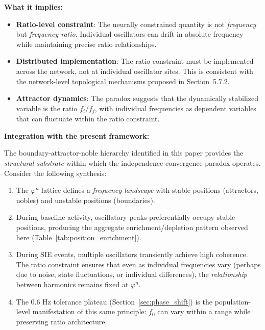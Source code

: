 \documentclass[11pt,a4paper]{article}
\newcommand{\phisym}{\varphi}
\newcommand{\fzero}{f_0}
\begin{document}
\textbf{What it implies:}
\begin{itemize}
    \item \textbf{Ratio-level constraint}: The neurally constrained quantity is not \textit{frequency} but \textit{frequency ratio}. Individual oscillators can drift in absolute frequency while maintaining precise ratio relationships.
    \item \textbf{Distributed implementation}: The ratio constraint must be implemented across the network, not at individual oscillator sites. This is consistent with the network-level topological mechanisms proposed in Section~5.7.2.
    \item \textbf{Attractor dynamics}: The paradox suggests that the dynamically stabilized variable is the ratio $f_i/f_j$, with individual frequencies as dependent variables that can fluctuate within the ratio constraint.
\end{itemize}

\textbf{Integration with the present framework:}

The boundary-attractor-noble hierarchy identified in this paper provides the \textit{structural substrate} within which the independence-convergence paradox operates. Consider the following synthesis:

\begin{enumerate}
    \item The $\phisym^n$ lattice defines a \textit{frequency landscape} with stable positions (attractors, nobles) and unstable positions (boundaries).

    \item During baseline activity, oscillatory peaks preferentially occupy stable positions, producing the aggregate enrichment/depletion pattern observed here (Table~\ref{tab:position_enrichment}).

    \item During SIE events, multiple oscillators transiently achieve high coherence. The ratio constraint ensures that even as individual frequencies vary (perhaps due to noise, state fluctuations, or individual differences), the \textit{relationship} between harmonics remains fixed at $\phisym^n$.

    \item The 0.6 Hz tolerance plateau (Section~\ref{sec:phase_shift}) is the population-level manifestation of this same principle: $\fzero$ can vary within a range while preserving ratio architecture.
\end{enumerate}
\end{document}
